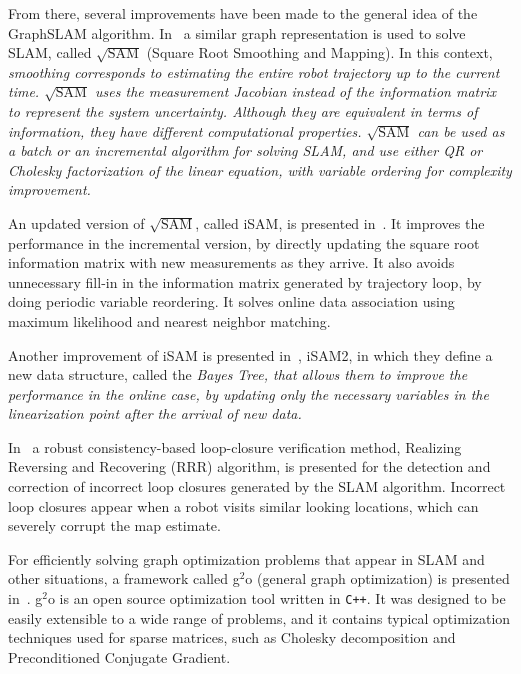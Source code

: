From there, several improvements have been made to the general idea of the GraphSLAM algorithm. In~\cite{sqrtsam} a similar graph representation is used to solve SLAM, called $\sqrt{\text{SAM}}$ (Square Root Smoothing and Mapping). In this context, \it{smoothing} corresponds to estimating the entire robot trajectory up to the current time. $\sqrt{\text{SAM}}$ uses the measurement Jacobian instead of the information matrix to represent the system uncertainty. Although they are equivalent in terms of information, they have different computational properties. $\sqrt{\text{SAM}}$ can be used as a batch or an incremental algorithm for solving SLAM, and use either QR or Cholesky factorization of the linear equation, with variable ordering for complexity improvement. 

An updated version of $\sqrt{\text{SAM}}$, called iSAM, is presented in~\cite{isam}. It improves the performance in the incremental version, by directly updating the square root information matrix with new measurements as they arrive. It also avoids unnecessary fill-in in the information matrix generated by trajectory loop, by doing periodic variable reordering. It solves online data association using maximum likelihood and nearest neighbor matching.

Another improvement of iSAM is presented in~\cite{isam2}, iSAM2, in which they define a new data structure, called the \it{Bayes Tree}, that allows them to improve the performance in the online case, by updating only the necessary variables in the linearization point after the arrival of new data. 

In~\cite{robustloop} a robust consistency-based loop-closure verification method, Realizing Reversing and Recovering (RRR) algorithm, is presented for the detection and correction of incorrect loop closures generated by the SLAM algorithm. Incorrect loop closures appear when a robot visits similar looking locations, which can severely corrupt the map estimate.     

For efficiently solving graph optimization problems that appear in SLAM and other situations, a framework called g$^2$o (general graph optimization) is presented in~\cite{g2o}. g$^2$o is an open source optimization tool written in \verb!C++!.  It was designed to be easily extensible to a wide range of problems, and it contains typical optimization techniques used for sparse matrices, such as Cholesky decomposition and Preconditioned Conjugate Gradient. 

